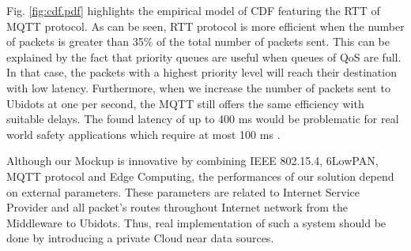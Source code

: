 Fig.
\ref{fig:cdf.pdf} highlights the empirical model of CDF featuring the RTT of MQTT protocol.
As can be seen,
	RTT protocol is more efficient when the number of packets is greater than 35\% of the total number of packets sent.
This can be explained by the fact that priority queues are useful when queues of QoS are full.
In that case,
	the packets with a highest priority level will reach their destination with low latency.
Furthermore,
	when we increase the number of packets sent to Ubidots at one per second,
	the MQTT still offers the same efficiency with suitable delays.
The found latency of up to 400 ms would be problematic for real world safety applications which require at most 100 ms \cite{Chen2017}.
 
Although our Mockup is innovative by combining IEEE 802.15.4, 6LowPAN,
	MQTT protocol and Edge Computing,
	the performances of our solution depend on external parameters.
These parameters are related to Internet Service Provider and all packet's routes throughout Internet network from the Middleware to Ubidots.
Thus,
	real implementation of such a system should be done by introducing a private Cloud near data sources.


